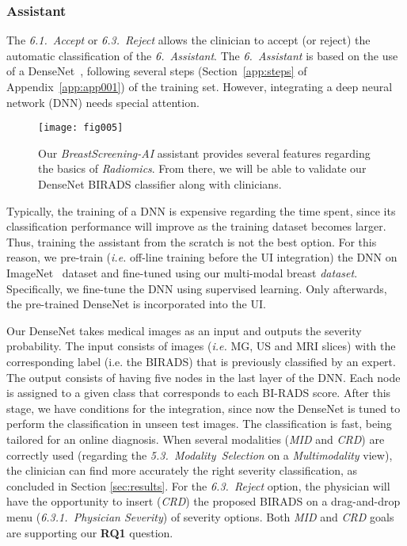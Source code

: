 \subsubsection{Assistant}

The {\it 6.1.~Accept} or {\it 6.3.~Reject} allows the clinician to accept (or reject) the automatic classification of the {\it 6.~Assistant}.
The {\it 6.~Assistant} is based on the use of a DenseNet~\cite{huang2017densely}, following several steps (Section~\ref{app:steps} of Appendix~\ref{app:app001}) of the training set.
However, integrating a deep neural network (DNN) needs special attention.

\begin{figure}[htbp]
\centering
\texttt{[image: fig005]}
\caption{Our {\it BreastScreening-AI} assistant provides several features regarding the basics of {\it Radiomics}. From there, we will be able to validate our DenseNet BIRADS classifier along with clinicians.}
\label{fig:fig005}
\end{figure}

Typically, the training of a DNN is expensive regarding the time spent, since its classification performance will improve as the training dataset becomes larger.
Thus, training the assistant from the scratch is not the best option.
For this reason, we pre-train ({\it i.e.} off-line training before the UI integration) the DNN on ImageNet~\cite{deng2009imagenet} dataset and fine-tuned using our multi-modal breast {\it dataset}.
Specifically, we fine-tune the DNN using supervised learning.
Only afterwards, the pre-trained DenseNet is incorporated into the UI.

Our DenseNet takes medical images as an input and outputs the severity probability.
The input consists of images ({\it i.e.} MG, US and MRI slices) with the corresponding label (i.e. the BIRADS) that is previously classified by an expert.
The output consists of having five nodes in the last layer of the DNN.
Each node is assigned to a given class that corresponds to each BI-RADS score.
After this stage, we have conditions for the integration, since now the DenseNet is tuned to perform the classification in unseen test images.
The classification is fast, being tailored for an online diagnosis.
When several modalities ({\it MID} and {\it CRD}) are correctly used (regarding the {\it 5.3.~Modality~Selection} on a {\it Multimodality} view), the clinician can find more accurately the right severity classification, as concluded in Section \ref{sec:results}.
For the {\it 6.3.~Reject} option, the physician will have the opportunity to insert ({\it CRD}) the proposed BIRADS on a drag-and-drop menu ({\it 6.3.1.~Physician Severity}) of severity options. Both {\it MID} and {\it CRD} goals are supporting our {\bf RQ1} question.

